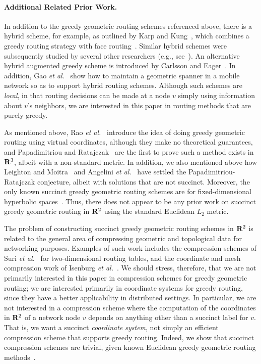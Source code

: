 \documentclass[11pt]{article}
\newcommand{\R}{{\bf R}}
\renewcommand{\subsection}[1]{\paragraph{#1.}}
\begin{document}
\subsection{Additional Related Prior Work}
In addition to the greedy geometric routing schemes referenced above,
there is a hybrid scheme, for example, as outlined by Karp and
Kung~\cite{kk-gpsr-00}, which
combines a greedy routing strategy with face
routing~\cite{bmsu-rgdah-01}.
Similar hybrid schemes were subsequently studied by several other
researchers 
(e.g., see~\cite{fs-odgfc-06,kwzz-gacr-03,kwz-aogma-02,kwz-wcoac-03}).
An alternative hybrid augmented greedy
scheme is introduced by Carlsson and Eager~\cite{ce-negrw-07}.
In addition, Gao {\it et al.}~\cite{gghzz-gsrmn-05} show how to
maintain a geometric spanner in a mobile network so as to support
hybrid routing schemes.
Although such schemes are \emph{local}, in that routing decisions can
be made at a node $v$ simply using information about $v$'s neighbors,
we are interested in this paper in routing methods that are purely
greedy.

As mentioned above,
Rao {\it et al.}~\cite{rrpss-grli-03} introduce the idea of doing
greedy geometric routing 
using virtual coordinates, although they make no theoretical guarantees,
and Papadimitriou and Ratajczak~\cite{pr-ocrgr-05}
are the first to prove such a method exists in $\R^3$,
albeit with a non-standard metric.
In addition,
we also mentioned above how
Leighton and Moitra~\cite{lm-srgem-08} 
and Angelini {\it et al.}~\cite{afg-acgdt-08}
have settled the Papadimitriou-Ratajczak conjecture, albeit with 
solutions that are not succinct.
Moreover,
the only known succinct greedy geometric routing schemes 
are for fixed-dimensional hyperbolic spaces~\cite{eg-sggdh-08,m-adgra-07}.
Thus, there does not appear to be any prior work on 
succinct greedy geometric routing in $\R^2$ using the standard
Euclidean $L_2$ metric.

The problem of constructing succinct greedy
geometric routing schemes in $\R^2$ is related to the general
area of compressing geometric and topological data for networking
purposes. Examples of such work includes the compression
schemes of Suri {\it et al.}~\cite{ssw-ctdrt-03} 
for two-dimensional routing tables,
and the coordinate and mesh compression work of 
Isenburg {\it et al.}~\cite{ils-lcpfp-05}.
We should stress, therefore, that we are not primarily interested
in this paper in compression schemes for greedy geometric routing; we
are interested primarily in coordinate systems for greedy routing, since they
have a better applicability in distributed settings.
In particular, we are not interested in a compression scheme where
the computation of the coordinates in $\R^2$ of a network node $v$
depends on anything other than a succinct label for $v$.
That is,
we want a succinct \emph{coordinate system}, not simply an efficient
compression scheme that supports greedy routing.
Indeed, we show that succinct compression schemes are trivial, given
known Euclidean greedy geometric routing
methods~\cite{afg-acgdt-08,lm-srgem-08}.
\end{document}
